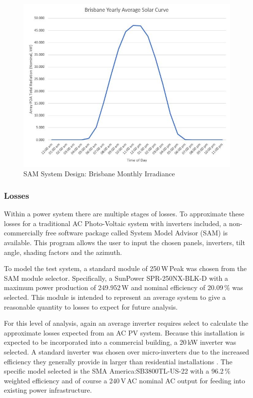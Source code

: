 \begin{figure}[H]
	\hfill\includegraphics[width = 120mm]{images/sam/test1-dailyirradiance}\hspace*{\fill}
	\caption{SAM System Design: Brisbane Monthly Irradiance} 
	\label{fig:SAM-test1-dailyirradiance}
\end{figure}

\subsubsection{Losses}

Within a power system there are multiple stages of losses. To approximate these losses for a traditional AC Photo-Voltaic system with inverters included, a non-commercially free software package called System Model Advisor (SAM) is available. This program allows the user to input the chosen panels, inverters, tilt angle, shading factors and the azimuth. 
\newline

To model the test system, a standard module of 250\,W\,Peak was chosen from the SAM module selector. Specifically, a SunPower SPR-250NX-BLK-D with a maximum power production of 249.952\,W and nominal efficiency of 20.09\,\% was selected. This module is intended to represent an average system to give a reasonable quantity to losses to expect for future analysis. 
\newline

For this level of analysis, again an average inverter requires select to calculate the approximate losses expected from an AC PV system. Because this installation is expected to be incorporated into a commercial building, a 20\,kW inverter was selected. A standard inverter was chosen over micro-inverters due to the increased efficiency they generally provide in larger than residential installations \cite{MicroInverterThesis}. The specific model selected is the SMA America:SB3800TL-US-22 with a 96.2\,\% weighted efficiency and of course a 240\,V\,AC nominal AC output for feeding into existing power infrastructure.
\newline 

